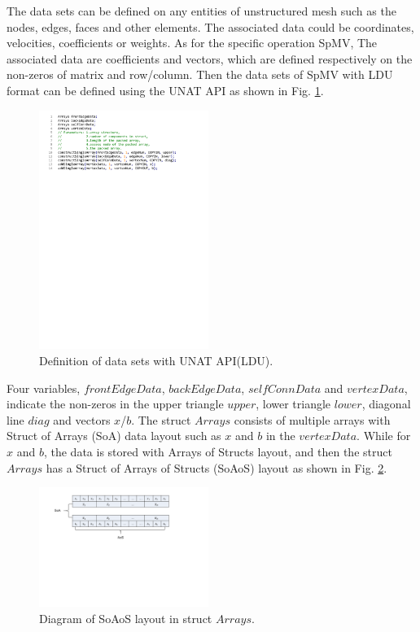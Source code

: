 \documentclass[5p,times]{elsarticle}
\begin{document}
The data sets can be defined on any entities of unstructured mesh such as the nodes, edges, faces and other elements. The associated data could be coordinates, velocities, coefficients or weights. As for the specific operation SpMV, The associated data are coefficients and vectors, which are defined respectively on the non-zeros of matrix and row/column. Then the data sets of SpMV with LDU format can be defined using the UNAT API as shown in Fig. \ref{dataset}.
\begin{figure}[htbp]
	\centerline{\includegraphics[width=0.49\textwidth]{data-set.pdf}}
	\caption{Definition of data sets with UNAT API(LDU).}
	\label{dataset}
\end{figure}
Four variables, $frontEdgeData$, $backEdgeData$, $selfConnData$ and $vertexData$, indicate the non-zeros in the upper triangle $upper$, lower triangle $lower$, diagonal line $diag$ and vectors $x$/$b$. The struct $Arrays$ consists of multiple arrays with Struct of Arrays (SoA) data layout such as $x$ and $b$ in the $vertexData$. While for $x$ and $b$, the data is stored with Arrays of Structs layout, and then the struct $Arrays$ has a Struct of Arrays of Structs (SoAoS) layout as shown in Fig. \ref{soaos}.

\begin{figure}[htbp]
	\centerline{\includegraphics[width=0.49\textwidth]{SoAoS.pdf}}
	\caption{Diagram of SoAoS layout in struct $Arrays$.}
	\label{soaos}
\end{figure}
\end{document}
